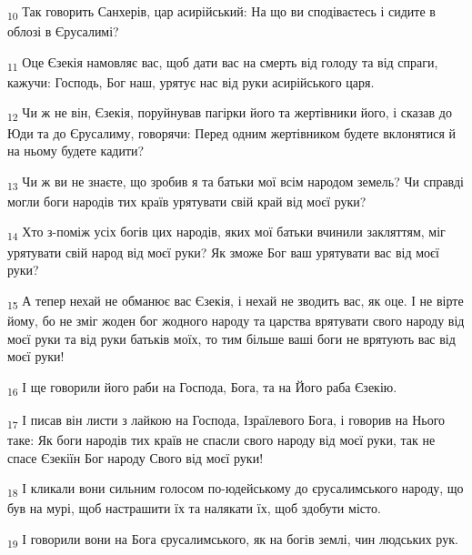 \begin{tcolorbox}
\textsubscript{10} Так говорить Санхерів, цар асирійський: На що ви сподіваєтесь і сидите в облозі в Єрусалимі?
\end{tcolorbox}
\begin{tcolorbox}
\textsubscript{11} Оце Єзекія намовляє вас, щоб дати вас на смерть від голоду та від спраги, кажучи: Господь, Бог наш, урятує нас від руки асирійського царя.
\end{tcolorbox}
\begin{tcolorbox}
\textsubscript{12} Чи ж не він, Єзекія, поруйнував пагірки його та жертівники його, і сказав до Юди та до Єрусалиму, говорячи: Перед одним жертівником будете вклонятися й на ньому будете кадити?
\end{tcolorbox}
\begin{tcolorbox}
\textsubscript{13} Чи ж ви не знаєте, що зробив я та батьки мої всім народом земель? Чи справді могли боги народів тих країв урятувати свій край від моєї руки?
\end{tcolorbox}
\begin{tcolorbox}
\textsubscript{14} Хто з-поміж усіх богів цих народів, яких мої батьки вчинили закляттям, міг урятувати свій народ від моєї руки? Як зможе Бог ваш урятувати вас від моєї руки?
\end{tcolorbox}
\begin{tcolorbox}
\textsubscript{15} А тепер нехай не обманює вас Єзекія, і нехай не зводить вас, як оце. І не вірте йому, бо не зміг жоден бог жодного народу та царства врятувати свого народу від моєї руки та від руки батьків моїх, то тим більше ваші боги не врятують вас від моєї руки!
\end{tcolorbox}
\begin{tcolorbox}
\textsubscript{16} І ще говорили його раби на Господа, Бога, та на Його раба Єзекію.
\end{tcolorbox}
\begin{tcolorbox}
\textsubscript{17} І писав він листи з лайкою на Господа, Ізраїлевого Бога, і говорив на Нього таке: Як боги народів тих країв не спасли свого народу від моєї руки, так не спасе Єзекіїн Бог народу Свого від моєї руки!
\end{tcolorbox}
\begin{tcolorbox}
\textsubscript{18} І кликали вони сильним голосом по-юдейському до єрусалимського народу, що був на мурі, щоб настрашити їх та налякати їх, щоб здобути місто.
\end{tcolorbox}
\begin{tcolorbox}
\textsubscript{19} І говорили вони на Бога єрусалимського, як на богів землі, чин людських рук.
\end{tcolorbox}
